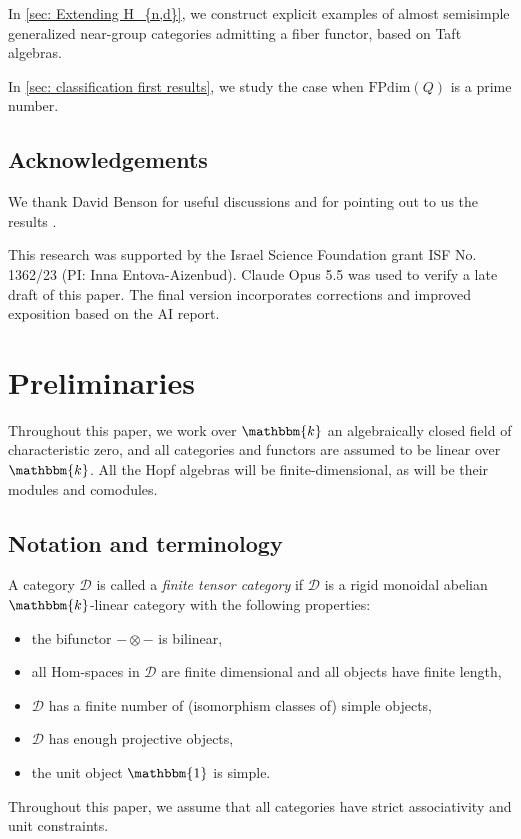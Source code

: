 \documentclass{amsart}
\theoremstyle{plain}%
\newtheorem*{introremark*}{Remark}
\theoremstyle{remark}
\newcommand{\1}{\mathbbm{1}}
\newcommand{\D}{\mathcal{D}}
\newcommand{\FPdim}{\mathrm{FPdim}}
\newcommand{\Hom}{\mathrm{Hom}}
\newcommand{\kk}{\mathbbm{k}}
\begin{document}
    In \cref{sec: Extending H_{n,d}}, we construct explicit examples of almost semisimple generalized near-group categories admitting a fiber functor, based on Taft algebras. 

    In \cref{sec: classification first results}, we study the case when $\FPdim(Q)$ is a prime number.

    
\subsection{Acknowledgements}
We thank David Benson for useful discussions and for pointing out to us the results \cite{DN}. 

This research was supported by the Israel Science Foundation grant ISF No. 1362/23 (PI: Inna Entova-Aizenbud). 
Claude Opus 5.5 was used to verify a late draft of this paper. The final version incorporates corrections and improved exposition based on the AI report. 

\section{Preliminaries}\label{sec: Preliminaries}
    Throughout this paper, we work over $\kk$ an algebraically closed field of characteristic zero, and all categories and functors are assumed to be linear over $\kk$. All the Hopf algebras will be finite-dimensional, as will be their modules and comodules.

    \subsection{Notation and terminology}\label{ssec:notn}
        A category $\D$ is called a {\it finite tensor category} if $\D$ is a rigid monoidal abelian $\kk$-linear category with the following properties:
        \begin{itemize}
            \item the bifunctor $-\otimes -$ is bilinear,
            \item all $\Hom$-spaces in $\D$ are finite dimensional and all objects have finite length,
            \item $\D$ has a finite number of (isomorphism classes of) simple objects,
            \item $\D$ has enough projective objects,
            \item the unit object $\1$ is simple.
        \end{itemize} Throughout this paper, we assume that all categories have strict associativity and unit constraints. 
\end{document}
